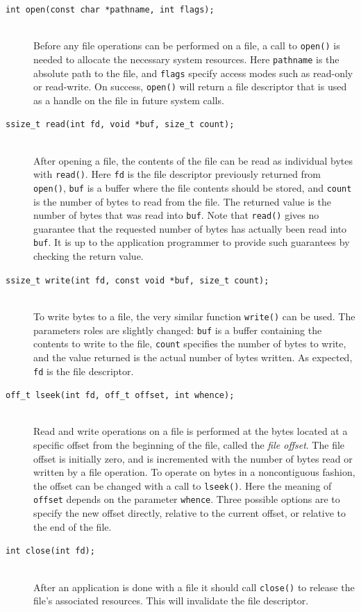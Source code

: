 \begin{description}
\item[\texttt{int open(const char *pathname, int flags);}] \hfill \\
Before any file operations can be performed on a file, a call to \texttt{open()} is needed to allocate the necessary system resources. Here \texttt{pathname} is the absolute path to the file, and \texttt{flags} specify access modes such as read-only or read-write. On success, \texttt{open()} will return a file descriptor that is used as a handle on the file in future system calls.
\item[\texttt{ssize\_t read(int fd, void *buf, size\_t count);}] \hfill \\
After opening a file, the contents of the file can be read as individual bytes with \texttt{read()}. Here \texttt{fd} is the file descriptor previously returned from \texttt{open()}, \texttt{buf} is a buffer where the file contents should be stored, and \texttt{count} is the number of bytes to read from the file. The returned value is the number of bytes that was read into \texttt{buf}. Note that \texttt{read()} gives no guarantee that the requested number of bytes has actually been read into \texttt{buf}. It is up to the application programmer to provide such guarantees by checking the return value.
\item[\texttt{ssize\_t write(int fd, const void *buf, size\_t count);}] \hfill \\
To write bytes to a file, the very similar function \texttt{write()} can be used. The parameters roles are slightly changed: \texttt{buf} is a buffer containing the contents to write to the file, \texttt{count} specifies the number of bytes to write, and the value returned is the actual number of bytes written. As expected, \texttt{fd} is the file descriptor.
\item[\texttt{off\_t lseek(int fd, off\_t offset, int whence);}] \hfill \\
Read and write operations on a file is performed at the bytes located at a specific offset from the beginning of the file, called the \emph{file offset}. The file offset is initially zero, and is incremented with the number of bytes read or written by a file operation. To operate on bytes in a noncontiguous fashion, the offset can be changed with a call to \texttt{lseek()}. Here the meaning of \texttt{offset} depends on the parameter \texttt{whence}. Three possible options are to specify the new offset directly, relative to the current offset, or relative to the end of the file.
\item[\texttt{int close(int fd);}] \hfill \\
After an application is done with a file it should call \texttt{close()} to release the file's associated resources. This will invalidate the file descriptor.
\end{description}

